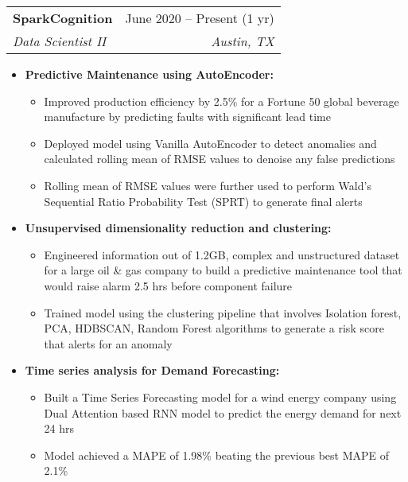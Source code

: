 \documentclass[letterpaper,12pt, margin=2in]{article}
\makeatletter
\newcommand{\resumeItem}[1]{
  \item\small{
    {#1 \vspace{-2pt}}
  }
}
\newcommand{\resumeSubheading}[4]{
  \vspace{-2pt}\item
    \begin{tabular*}{0.97\textwidth}[t]{l@{\extracolsep{\fill}}r}
      \textbf{#1} & #2 \\
      \textit{\small#3} & \textit{\small #4} \\
    \end{tabular*}\vspace{-8pt}
}
\newcommand{\resumeItemListStart}{\begin{itemize}}
\newcommand{\resumeItemListEnd}{\end{itemize}\vspace{-8pt}}
\makeatother
\begin{document}
    \resumeSubheading
      {SparkCognition}{June 2020 -- Present (1 yr)}
      {Data Scientist II}{Austin, TX}
      \resumeItemListStart
        \resumeItem{\textbf{Predictive Maintenance using AutoEncoder:}}
        \resumeItemListStart
            \resumeItem{Improved production efficiency by 2.5\% for a Fortune 50 global beverage manufacture by predicting faults with significant lead time}
            \resumeItem{Deployed model using Vanilla AutoEncoder to detect anomalies and calculated rolling mean of RMSE values to denoise any false predictions}
            \resumeItem{Rolling mean of RMSE values were further used to perform Wald's Sequential Ratio Probability Test (SPRT) to generate final alerts}
            \vspace{0.1in}
        \resumeItemListEnd
        \resumeItem{\textbf{Unsupervised dimensionality reduction and clustering: }}
        \resumeItemListStart
            \resumeItem{Engineered information out of 1.2GB, complex and unstructured dataset for a large oil & gas company to build a predictive maintenance tool that would raise alarm 2.5 hrs before component failure}
            \resumeItem{Trained model using the clustering pipeline that involves Isolation forest, PCA, HDBSCAN, Random Forest algorithms to generate a risk score that alerts for an anomaly}
            \vspace{0.1in}
        \resumeItemListEnd
        \resumeItem{\textbf{Time series analysis for Demand Forecasting: }}
        \resumeItemListStart
            \resumeItem{Built a Time Series Forecasting model for a wind energy company using Dual Attention based RNN model to predict the energy demand for next 24 hrs}
            \resumeItem{Model achieved a MAPE of 1.98\% beating the previous best MAPE of 2.1\%}
            \vspace{0.1in}
        \resumeItemListEnd
      \resumeItemListEnd
\end{document}
